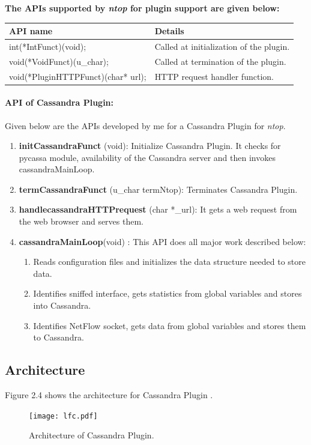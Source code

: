       \textbf{The APIs supported by \emph{ntop} for plugin support are given below:}\\
     
     \begin{tabular}{|l|l|}
	\hline
	\textbf{API name} &  \textbf{Details}\\
	\hline
	int(*IntFunct)(void); & Called at initialization of the plugin.\\
	\hline
	void(*VoidFunct)(u\_char); & Called at termination of the plugin.\\
	\hline
	void(*PluginHTTPFunct)(char* url); & HTTP request handler function.\\
	\hline
      \end{tabular}
      
      
      \paragraph{API of Cassandra Plugin:} Given below are the APIs developed by me for a
      Cassandra Plugin for \emph{ntop}.\\
      
      \begin{enumerate}
       \item {\bf initCassandraFunct } (void): Initialize Cassandra Plugin. It checks for pycassa module, availability of the Cassandra server and then invokes cassandraMainLoop.
       \item {\bf termCassandraFunct} (u\_char termNtop): Terminates Cassandra Plugin.
       \item {\bf handlecassandraHTTPrequest} (char *\_url): It gets a web request from the web browser and serves them.\\
       \item {\bf cassandraMainLoop}(void) : This API does all major work described below:
	      \begin{enumerate}
	      \item Reads configuration files and initializes the data structure needed to store data.
	       \item Identifies sniffed interface, gets statistics from global variables and stores into Cassandra.
	       \item Identifies NetFlow socket, gets data from global variables and stores them to Cassandra. 
	      \end{enumerate}
      \end{enumerate}

      \subsection{Architecture}
      Figure 2.4 shows the architecture for Cassandra Plugin .
            \begin{figure}[htb]
	    \centering
	    \texttt{[image: lfc.pdf]}
	    \caption{Architecture of Cassandra Plugin.} 
	  \end{figure}
